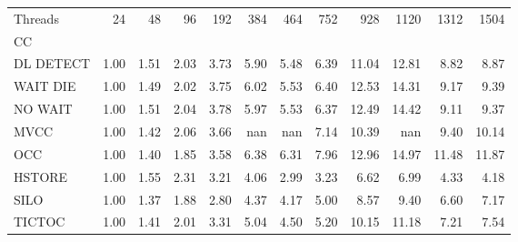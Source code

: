 \begin{tabular}{lrrrrrrrrrrr}
\toprule
Threads &  24   &  48   &  96   &  192  &  384  &  464  &  752  &  928  &  1120 &  1312 &  1504 \\
CC        &       &       &       &       &       &       &       &       &       &       &       \\
\midrule
DL DETECT &  1.00 &  1.51 &  2.03 &  3.73 &  5.90 &  5.48 &  6.39 & 11.04 & 12.81 &  8.82 &  8.87 \\
WAIT DIE  &  1.00 &  1.49 &  2.02 &  3.75 &  6.02 &  5.53 &  6.40 & 12.53 & 14.31 &  9.17 &  9.39 \\
NO WAIT   &  1.00 &  1.51 &  2.04 &  3.78 &  5.97 &  5.53 &  6.37 & 12.49 & 14.42 &  9.11 &  9.37 \\
MVCC      &  1.00 &  1.42 &  2.06 &  3.66 &   nan &   nan &  7.14 & 10.39 &   nan &  9.40 & 10.14 \\
OCC       &  1.00 &  1.40 &  1.85 &  3.58 &  6.38 &  6.31 &  7.96 & 12.96 & 14.97 & 11.48 & 11.87 \\
HSTORE    &  1.00 &  1.55 &  2.31 &  3.21 &  4.06 &  2.99 &  3.23 &  6.62 &  6.99 &  4.33 &  4.18 \\
SILO      &  1.00 &  1.37 &  1.88 &  2.80 &  4.37 &  4.17 &  5.00 &  8.57 &  9.40 &  6.60 &  7.17 \\
TICTOC    &  1.00 &  1.41 &  2.01 &  3.31 &  5.04 &  4.50 &  5.20 & 10.15 & 11.18 &  7.21 &  7.54 \\
\bottomrule
\end{tabular}
